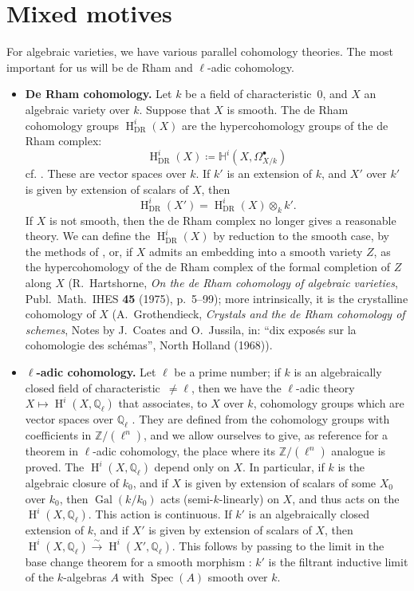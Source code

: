 \documentclass{article}
\theoremstyle{definition}
\newenvironment{env}[1]
  {\renewcommand\theinnerenv{(#1)}\innerenv}
  {\endinnerenv}
\newcommand{\bb}{\mathbb}
\newcommand{\ZZ}{\bb{Z}}
\newcommand{\QQ}{\bb{Q}}
\newcommand{\DR}{{\mathrm{DR}}}
\DeclareMathOperator{\Gal}{Gal}
\DeclareMathOperator{\Spec}{Spec}
\DeclareMathOperator{\HH}{H}
\newcommand{\oldpage}[1]{\marginpar{\footnotesize$\Big\vert$ \textit{p.~#1}}}
\begin{document}
\section{Mixed motives}
\label{1}
\oldpage{11~(89)}

\begin{env}{1.1}
\label{1.1}
  For algebraic varieties, we have various parallel cohomology theories.
  The most important for us will be de Rham and $\ell$-adic cohomology.

  \begin{itemize}
    \item \textbf{De Rham cohomology.}
      Let $k$ be a field of characteristic~$0$, and $X$ an algebraic variety over $k$.
      Suppose that $X$ is smooth.
      The de Rham cohomology groups $\HH_\DR^i(X)$ are the hypercohomology groups of the de Rham complex:
      \[
        \HH_\DR^i(X)
        \coloneqq \mathbb{H}^i(X,\Omega_{X/k}^\bullet)
      \]
      cf. \cite{G}.
      These are vector spaces over $k$.
      If $k'$ is an extension of $k$, and $X'$ over $k'$ is given by extension of scalars of $X$, then
      \[
        \HH_\DR^i(X') = \HH_\DR^i(X)\otimes_k k'.
      \]
      If $X$ is not smooth, then the de Rham complex no longer gives a reasonable theory.
      We can define the $\HH_\DR^i(X)$ by reduction to the smooth case, by the methods of \cite{D3}, or, if $X$ admits an embedding into a smooth variety $Z$, as the hypercohomology of the de Rham complex of the formal completion of $Z$ along $X$ (R.~Hartshorne, \emph{On the de Rham cohomology of algebraic varieties}, Publ.~Math.~IHES \textbf{45} (1975), p.~5--99);
      more intrinsically, it is the crystalline cohomology of $X$ (A.~Grothendieck, \emph{Crystals and the de Rham cohomology of schemes}, Notes by J.~Coates and O.~Jussila, in: ``dix expos\'{e}s sur la cohomologie des sch\'{e}mas'', North Holland (1968)).
    \item \textbf{$\ell$-adic cohomology.}
      Let $\ell$ be a prime number;
      if $k$ is an algebraically closed field of characteristic~$\neq\ell$, then we have the $\ell$-adic theory $X\mapsto\HH^i(X,\QQ_\ell)$ that associates, to $X$ over $k$, cohomology groups which are vector spaces over $\QQ_\ell$ \cite[\S VI]{SGA5}.
      They are defined from the cohomology groups with coefficients in $\ZZ/(\ell^n)$, and we allow ourselves to give, as reference for a theorem in $\ell$-adic cohomology, the place where its $\ZZ/(\ell^n)$ analogue is proved.
      The $\HH^i(X,\QQ_\ell)$ depend only on $X$.
      In particular, if $k$ is the algebraic closure of $k_0$, and if $X$ is given by extension of scalars of some $X_0$ over $k_0$, then $\Gal(k/k_0)$ acts (semi-$k$-linearly) on $X$, and thus acts on the $\HH^i(X,\QQ_\ell)$.
      This action is continuous.
      If $k'$ is an algebraically closed extension of $k$, and if $X'$ is given by extension of scalars of $X$, then $\HH^i(X,\QQ_\ell)\xrightarrow{\sim}\HH^i(X',\QQ_\ell)$.
      \oldpage{12~(90)}
      This follows by passing to the limit in the base change theorem for a smooth morphism \cite[\S XVI, 1.2]{SGA4}: $k'$ is the filtrant inductive limit of the $k$-algebras $A$ with $\Spec(A)$ smooth over $k$.
  \end{itemize}


\end{env}
\end{document}
